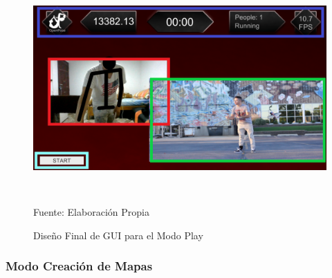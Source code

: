\begin{figure}[t!]
	\centering
	\includegraphics[width=14cm,height=8cm,]{./Images/poseitplay.png}
	\caption{Diseño Final de GUI para el Modo Play}
	\footnotesize Fuente: Elaboración Propia
	\label{guiplay2}
\end{figure}

\subsubsection{Modo Creación de Mapas}

